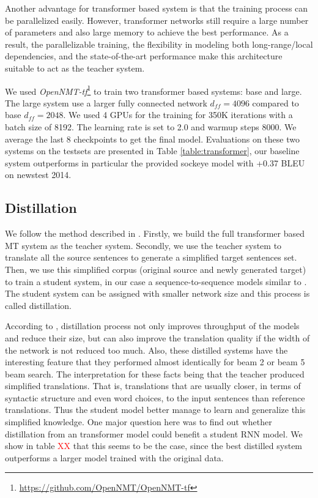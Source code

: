 \documentclass[11pt,a4paper]{article}
\begin{document}
Another advantage for transformer based system is that the training process can be parallelized easily.
However, transformer networks still require a large number of parameters and also large memory to achieve the best performance.
As a result, the parallelizable training, the flexibility in modeling both long-range/local
dependencies, and the state-of-the-art performance make this architecture suitable to act as the teacher system.

We used \textit{OpenNMT-tf}\footnote{\url{https://github.com/OpenNMT/OpenNMT-tf}} to train two transformer based systems: base and large.
The large system  use a larger fully connected network $d_{ff}=4096$ compared to base $d_{ff}=2048$.
We used 4 GPUs for the training for 350K iterations with a batch size of 8192.
The learning rate is set to 2.0 and warmup steps 8000.
We average the last 8 checkpoints to get the final model.
Evaluations on these two systems on the testsets are presented in Table \ref{table:transformer}, our baseline system outperforms in particular the provided sockeye model with +0.37 BLEU on newstest 2014.


\subsection{Distillation}
\label{distill}

We follow the method described in . Firstly, we build the full transformer based MT system \cite{vaswani2017attention} as the teacher system. Secondly, we use the teacher system to translate all the source sentences to generate a simplified target sentences set.
Then, we use this simplified corpus (original source and newly generated target) to train a student system, in our case a sequence-to-sequence models similar to .
The student system can be assigned with smaller network size and this process is called distillation.

According to , distillation process not only improves throughput of the models and reduce their size, but can also improve the translation quality if the width of the network is not reduced too much. Also, these distilled systems have the interesting feature that they performed almost identically for beam 2 or beam 5 beam search. The interpretation for these facts being that the teacher produced simplified translations. That is, translations that are usually closer, in terms of syntactic structure and even word choices, to the input sentences than reference translations. Thus the student model better manage to learn and generalize this simplified knowledge. One major question here was to find out whether distillation from an transformer model could benefit a student RNN model. We show in table  \textcolor{red}{XX} that this seems to be the case, since the best distilled system outperforms a larger model trained with the original data.
\end{document}
